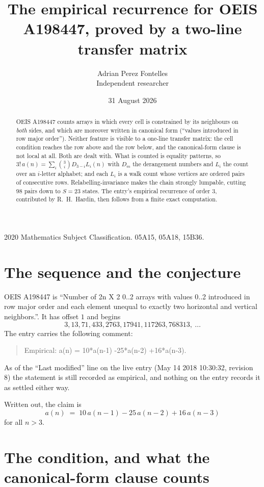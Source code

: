 \documentclass[11pt,a4paper]{article}
\title{The empirical recurrence for OEIS A198447, proved by a two-line transfer matrix}
\author{Adrian Perez Fontelles\\ \small Independent researcher}
\date{31 August 2026}
\theoremstyle{plain}
\theoremstyle{definition}
\begin{document}
\maketitle

\begin{abstract}
OEIS A198447 counts arrays in which every cell is constrained by its neighbours on \emph{both}
sides, and which are moreover written in canonical form (``values introduced in row major
order''). Neither feature is visible to a one-line transfer matrix: the cell condition
reaches the row above and the row below, and the canonical-form clause is not local at
all. Both are dealt with. What is counted is equality patterns, so
$3!\,a(n)=\sum_i\binom{3}{i}D_{3-i}L_i(n)$ with $D_m$ the derangement numbers and
$L_i$ the count over an $i$-letter alphabet; and each $L_i$ is a walk count whose vertices
are ordered pairs of consecutive rows. Relabelling-invariance makes the chain strongly
lumpable, cutting $98$ pairs down to $S=23$ states. The entry's empirical recurrence of
order $3$, contributed by R.~H.~Hardin, then follows from a finite exact computation.
\end{abstract}

\noindent\small 2020 Mathematics Subject Classification. 05A15, 05A18, 15B36.\normalsize

\section{The sequence and the conjecture}

OEIS A198447 is ``Number of 2n X 2 0..2 arrays with values 0..2 introduced in row major order and each element unequal to exactly two horizontal and vertical neighbors.''. It has offset $1$ and begins
\[
3, 13, 71, 433, 2763, 17941, 117263, 768313,\ \dots
\]
The entry carries the following comment:
\begin{quote}\small
Empirical: a(n) = 10*a(n-1) -25*a(n-2) +16*a(n-3).
\end{quote}
As of the ``Last modified'' line on the live entry (May 14 2018 10:30:32, revision 8) the statement is
still recorded as empirical, and nothing on the entry records it as settled either way.

Written out, the claim is
\begin{equation}\label{eq:conj}
a(n)\;=\;10\,a(n-1) - 25\,a(n-2) + 16\,a(n-3)
\end{equation}
for all $n>3$.

\section{The condition, and what the canonical-form clause counts}
\end{document}
